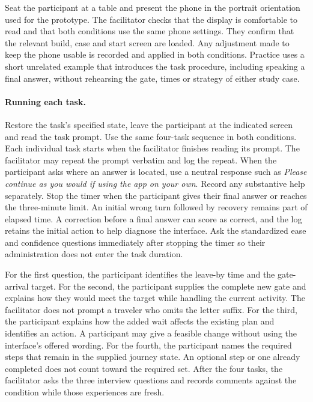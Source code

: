 \documentclass[sigconf,nonacm,balance=false]{acmart}
\begin{document}
Seat the participant at a table and present the phone in the portrait orientation used for the prototype. The facilitator checks that the display is comfortable to read and that both conditions use the same phone settings. They confirm that the relevant build, case and start screen are loaded. Any adjustment made to keep the phone usable is recorded and applied in both conditions. Practice uses a short unrelated example that introduces the task procedure, including speaking a final answer, without rehearsing the gate, times or strategy of either study case.

\paragraph{Running each task.} Restore the task's specified state, leave the participant at the indicated screen and read the task prompt. Use the same four-task sequence in both conditions. Each individual task starts when the facilitator finishes reading its prompt. The facilitator may repeat the prompt verbatim and log the repeat. When the participant asks where an answer is located, use a neutral response such as \emph{Please continue as you would if using the app on your own}. Record any substantive help separately. Stop the timer when the participant gives their final answer or reaches the three-minute limit. An initial wrong turn followed by recovery remains part of elapsed time. A correction before a final answer can score as correct, and the log retains the initial action to help diagnose the interface. Ask the standardized ease and confidence questions immediately after stopping the timer so their administration does not enter the task duration.

For the first question, the participant identifies the leave-by time and the gate-arrival target. For the second, the participant supplies the complete new gate and explains how they would meet the target while handling the current activity. The facilitator does not prompt a traveler who omits the letter suffix. For the third, the participant explains how the added wait affects the existing plan and identifies an action. A participant may give a feasible change without using the interface's offered wording. For the fourth, the participant names the required steps that remain in the supplied journey state. An optional step or one already completed does not count toward the required set. After the four tasks, the facilitator asks the three interview questions and records comments against the condition while those experiences are fresh.
\end{document}
